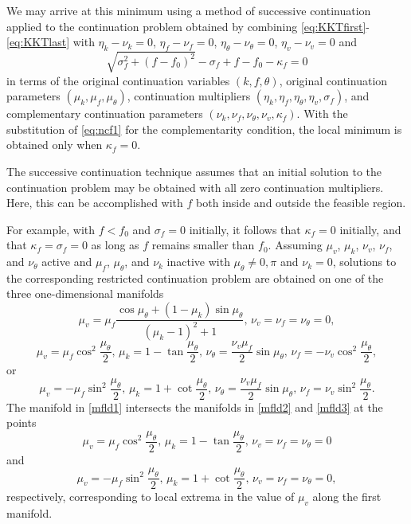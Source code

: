 We may arrive at this minimum using a method of successive continuation applied to the continuation problem obtained by combining \eqref{eq:KKTfirst}-\eqref{eq:KKTlast} with $\eta_k-\nu_k=0$, $\eta_f-\nu_f=0$, $\eta_\theta-\nu_\theta=0$, $\eta_v-\nu_v=0$ and
\begin{equation}
\label{eq:ncf1}
\sqrt{\sigma_f^2+(f-f_0)^2}-\sigma_f+f-f_0-\kappa_f=0
\end{equation}
in terms of the original continuation variables $(k,f,\theta)$, original continuation parameters $(\mu_k,\mu_f,\mu_\theta)$, continuation multipliers $(\eta_k,\eta_f,\eta_\theta,\eta_v,\sigma_f)$, and complementary continuation parameters $(\nu_k,\nu_f,\nu_\theta,\nu_v,\kappa_f)$. With the substitution of \eqref{eq:ncf1} for the complementarity condition, the local minimum is obtained only when $\kappa_f=0$.


The successive continuation technique assumes that an initial solution to the continuation problem may be obtained with all zero continuation multipliers. Here, this can be accomplished with $f$ both inside and outside the feasible region.

For example, with $f<f_0$ and $\sigma_f=0$ initially, it follows that $\kappa_f=0$ initially, and that $\kappa_f=\sigma_f=0$ as long as $f$ remains smaller than $f_0$. Assuming $\mu_v$, $\mu_k$, $\nu_v$, $\nu_f$, and $\nu_\theta$ active and $\mu_f$, $\mu_\theta$, and $\nu_k$ inactive with $\mu_\theta\ne 0,\pi$ and $\nu_k=0$, solutions to the corresponding restricted continuation problem are obtained on one of the three one-dimensional manifolds
\begin{equation}
\label{mfld1}
\mu_v=\mu_f\frac{\cos\mu_\theta+(1-\mu_k)\sin\mu_\theta}{(\mu_k-1)^2+1},\,\nu_v=\nu_f=\nu_\theta=0,
\end{equation}
\begin{equation}
\label{mfld2}
\mu_v=\mu_f\cos^2\frac{\mu_\theta}{2},\,\mu_k=1-\tan\frac{\mu_\theta}{2},\,\nu_\theta=\frac{\nu_v\mu_f}{2}\sin\mu_\theta,\,\nu_f=-\nu_v\cos^2\frac{\mu_\theta}{2},
\end{equation}
or
\begin{equation}
\label{mfld3}
\mu_v=-\mu_f\sin^2\frac{\mu_\theta}{2},\,\mu_k=1+\cot\frac{\mu_\theta}{2},\,\nu_\theta=\frac{\nu_v\mu_f}{2}\sin\mu_\theta,\,\nu_f=\nu_v\sin^2\frac{\mu_\theta}{2}.
\end{equation}
The manifold in \eqref{mfld1} intersects the manifolds in \eqref{mfld2} and \eqref{mfld3} at the points
\begin{equation}
\mu_v=\mu_f\cos^2\frac{\mu_\theta}{2},\,\mu_k=1-\tan\frac{\mu_\theta}{2},\,\nu_v=\nu_f=\nu_\theta=0
\end{equation}
and
\begin{equation}
\mu_v=-\mu_f\sin^2\frac{\mu_\theta}{2},\,\mu_k=1+\cot\frac{\mu_\theta}{2},\,\nu_v=\nu_f=\nu_\theta=0,
\end{equation}
respectively, corresponding to local extrema in the value of $\mu_v$ along the first manifold.


